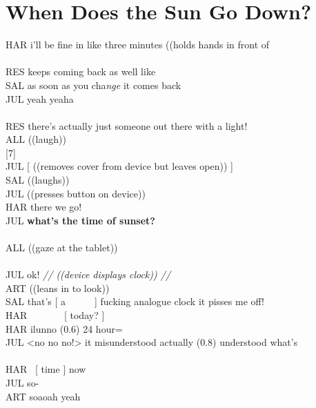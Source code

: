 \section{When Does the Sun Go Down?}\label{app:fragments-cafe sunset}
\begin{inlinefrag} 
    \begin{transcript}
        \by HAR {i’ll be fine in like three minutes ((holds hands in front of} \\
         \\
        \by RES {keeps coming back as well like} \\
        \by SAL {as soon as you cha\emph{nge} it comes back} \\
        \by JUL {yeah yeaha} \\
         \\
        \by RES {there’s actually just someone out there with a light!} \\
        \by ALL {((laugh))} \\
        \later {\ldots}[7] \\
        \by JUL {[ ((removes cover from device but leaves open)) ]} \\
        \by SAL {((laughs))} \\
        \by JUL {((presses button on device))} \\
        \by HAR {there we go!} \\
        \by JUL {\textbf{what’s the time of sunset?}} \\
         \\
        \by ALL {((gaze at the tablet))} \\
         \\
        \by JUL {ok! \textit{// ((device displays clock)) //}} \\
        \by ART {((leans in to look))} \\
        \by SAL {that’s [ a~~~~~~] fucking analogue clock it pisses me off!} \\
        \by HAR {~~~~~~~[ today? ]} \\
        \by HAR {ilunno (0.6) 24 hour=} \\
        \by JUL {<no no no!> it misunderstood actually (0.8) understood what’s} \\
         \\
        \by HAR {~[ time ] now} \\
        \by JUL {so-} \\
        \by ART {soaoah yeah\intUp} \\

\end{transcript}
\end{inlinefrag}
